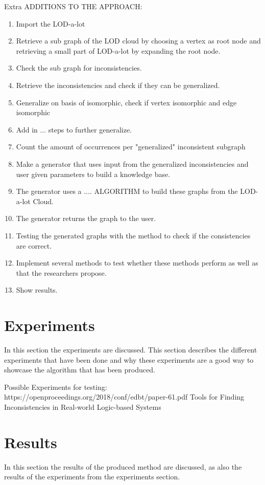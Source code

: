 \documentclass{article}
\begin{document}
Extra ADDITIONS TO THE APPROACH:

\begin{enumerate}
	\item Import the LOD-a-lot %
	\item Retrieve a sub graph of the LOD cloud by choosing a vertex as root node and retrieving a small part of LOD-a-lot by expanding the root node. %
	\item Check the sub graph for inconsistencies. %
	\item Retrieve the inconsistencies and check if they can be generalized. %
	\item Generalize on basis of isomorphic, check if vertex isomorphic and edge isomorphic %
	\item Add in ... steps to further generalize. %
	\item Count the amount of occurrences per "generalized" inconsistent subgraph %
	\item Make a generator that uses input from the generalized inconsistencies and user given parameters to build a knowledge base. %
	\item The generator uses a .... ALGORITHM to build these graphs from the LOD-a-lot Cloud. %
	\item The generator returns the graph to the user. %
	\item Testing the generated graphs with the method to check if the consistencies are correct. %
	\item Implement several methods to test whether these methods perform as well as that the researchers propose. %
	\item Show results. %
\end{enumerate}


\newpage
\section{Experiments}
In this section the experiments are discussed. This section describes the different experiments that have been done and why these experiments are a good way to showcase the algorithm that has been produced.


Possible Experiments for testing:
https://openproceedings.org/2018/conf/edbt/paper-61.pdf
Tools for Finding Inconsistencies in Real-world Logic-based Systems


\newpage
\section{Results}
In this section the results of the produced method are discussed, as also the results of the experiments from the experiments section.
\end{document}
